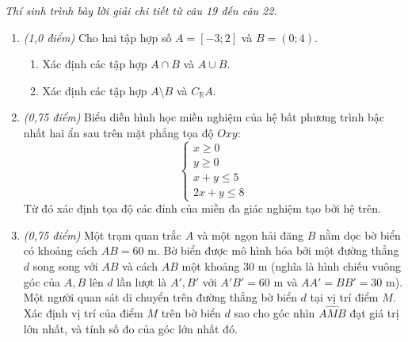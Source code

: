 \documentclass[12pt,a4paper]{article}
\newcommand{\parttitle}[1]{\par\vspace{2pt}{\large\bfseries\color{ink}#1}\par\vspace{1pt}}
\begin{document}
\parttitle{PHẦN IV. Tự luận}
\textit{Thí sinh trình bày lời giải chi tiết từ câu 19 đến câu 22.}
\begin{enumerate}[resume]
\item \textit{(1,0 điểm)} Cho hai tập hợp số $A = [-3; 2]$ và $B = (0; 4)$.
\begin{enumerate}
    \item Xác định các tập hợp $A \cap B$ và $A \cup B$.
    \item Xác định các tập hợp $A \setminus B$ và $C_{\mathbb{R}} A$.
\end{enumerate}

\item \textit{(0,75 điểm)} Biểu diễn hình học miền nghiệm của hệ bất phương trình bậc nhất hai ẩn sau trên mặt phẳng tọa độ $Oxy$:
\[
\begin{cases}
x \ge 0 \\
y \ge 0 \\
x + y \le 5 \\
2x + y \le 8
\end{cases}
\]
Từ đó xác định tọa độ các đỉnh của miền đa giác nghiệm tạo bởi hệ trên.

\item \textit{(0,75 điểm)} Một trạm quan trắc $A$ và một ngọn hải đăng $B$ nằm dọc bờ biển có khoảng cách $AB = 60\text{ m}$. Bờ biển được mô hình hóa bởi một đường thẳng $d$ song song với $AB$ và cách $AB$ một khoảng $30\text{ m}$ (nghĩa là hình chiếu vuông góc của $A, B$ lên $d$ lần lượt là $A', B'$ với $A'B' = 60\text{ m}$ và $AA' = BB' = 30\text{ m}$). Một người quan sát di chuyển trên đường thẳng bờ biển $d$ tại vị trí điểm $M$.
Xác định vị trí của điểm $M$ trên bờ biển $d$ sao cho góc nhìn $\widehat{AMB}$ đạt giá trị lớn nhất, và tính số đo của góc lớn nhất đó.


\end{enumerate}
\end{document}
